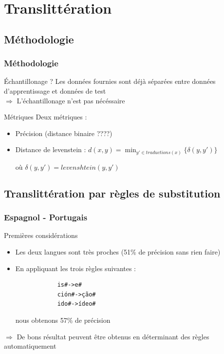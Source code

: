 \documentclass{beamer}
\begin{document}
\section{Translittération}


\begin{frame}
\tableofcontents[currentsection]
\end{frame}


\subsection{Méthodologie}

\begin{frame}
\frametitle{Méthodologie}

	\begin{block}{Échantillonage ?}
	Les données fournies sont déjà séparées entre données d'apprentissage et données de test\\
	$\Longrightarrow$ L'échantillonage n'est pas nécéssaire
	\end{block}

	\begin{block}{Métriques}
	Deux métriques  :
		\begin{itemize}
		\item Précision (distance binaire ????)
		\item Distance de levenstein : $d(x,y) = \min_{y' \in traductions(x)} \{\delta(y,y')\}$

où $\delta(y,y')=levenshtein(y,y')$
		\end{itemize}		
	\end{block}
\end{frame}

\subsection{Translittération par règles de substitution}


\begin{frame}[fragile]
	\frametitle{Espagnol - Portugais}

	\begin{block}{Premières considérations}
		\begin{itemize}
		\item Les deux langues sont très proches (51\% de précision sans rien faire)
		\item En appliquant les trois règles suivantes : {\scriptsize \begin{verbatim}
			is#->e#
			ción#->ção#
			ido#->ídeo#
			\end{verbatim}}
			nous obtenons 57\% de précision
		\end{itemize}
	\end{block}

	\begin{alertblock}{}
	$\Longrightarrow$ De bons résultat peuvent être obtenus en déterminant des règles automatiquement 
	\end{alertblock}
\end{frame}
\end{document}
